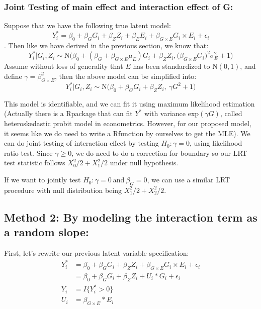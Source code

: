 \documentclass[
]{article}
\begin{document}
\hypertarget{joint-testing-of-main-effect-and-interaction-effect-of-g}{%
\subsubsection{Joint Testing of main effect and interaction effect of
G:}\label{joint-testing-of-main-effect-and-interaction-effect-of-g}}

Suppose that we have the following true latent model:
\[ Y_i ^{*} = \beta_0 + \beta_G G_i + \beta_Z Z_i + \beta_E E_i + \beta_{G\times E}G_i \times E_i + \epsilon_i \].
Then like we have derived in the previous section, we know that:
\[Y_i^*|G_i, Z_i \sim \text{N}\bigg(\beta_0 + (\beta_G + \beta_{G\times E} \mu_E)G_i + \beta_Z Z_i,  \big(\beta_{G\times E} G_i\big)^2 \sigma_E^2 + 1\bigg)\]
Assume without loss of generality that \(E\) has been standardized to
\(\text{N}(0,1)\), and define \(\gamma = \beta_{G\times E}^2\), then the
above model can be simplified into:
\[Y_i^*|G_i, Z_i \sim \text{N}\bigg(\beta_0 + \beta_GG_i + \beta_ZZ_i,\ \gamma G^2 + 1\bigg)\]

This model is identifiable, and we can fit it using maximum likelihood
estimation (Actually there is a Rpackage that can fit \(Y^*\) with
variance \(\text{exp}(\gamma G)\), called heteroskedastic probit model
in econometrics. However, for our proposed model, it seems like we do
need to write a Rfunction by ourselves to get the MLE). We can do joint
testing of interaction effect by testing \(H_0: \gamma = 0\), using
likelihood ratio test. Since \(\gamma \geq 0\), we do need to do a
correction for boundary so our LRT test statistic follows
\(X^2_{0}/2 +X^2_{1}/2\) under null hypothesis.

If we want to jointly test
\(H_0: \gamma = 0 \ \text{and} \ \beta_G =0\), we can use a similar LRT
procedure with null distribution being \(X^2_{1}/2 +X^2_{2}/2\).

\hypertarget{method-2-by-modeling-the-interaction-term-as-a-random-slope}{%
\subsection{Method 2: By modeling the interaction term as a random
slope:}\label{method-2-by-modeling-the-interaction-term-as-a-random-slope}}

First, let's rewrite our previous latent variable specification:
\begin{equation}\label{eqn:latentformulationRandomSlope}
\begin{aligned}
Y_i^* &= \beta_0 + \beta_G G_i + \beta_Z Z_i + \beta_{G\times E} G_i \times E_i + \epsilon_i \\
      &= \beta_0 + \beta_G G_i + \beta_Z Z_i + U_i * G_i + \epsilon_i \\
Y_i &= I\{Y_i^*>0\} \\
U_i &= \beta_{G\times E} * E_i
\end{aligned}
\end{equation}
\end{document}
